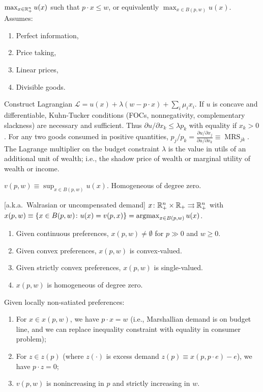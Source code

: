 \documentclass[8pt,letterpaper, landscape]{extarticle} %
\begin{document}
\begin{multicols}{3}
\begin{description}
 $ \max_{x \in \mathbb{R}^{n}_{+}} u(x) $ such that $ p \cdot x \leq w $, or equivalently $ \max_{x \in B(p,w)} u(x) $. Assumes:
\begin{enumerate}
\item Perfect information,
\item Price taking,
\item Linear prices,
\item Divisible goods.
\end{enumerate}
Construct Lagrangian $ \mathcal{L} = u(x) + \lambda (w - p \cdot x) + \sum_{i} \mu_i x_i $. If $ u $ is concave and differentiable, Kuhn-Tucker conditions (FOCs, nonnegativity, complementary slackness) are necessary and sufficient. Thus $ \partial u / \partial x_k \leq \lambda p_k $ with equality if $ x_k > 0 $. For any two goods consumed in positive quantities, $ p_j / p_k = \frac{\partial u / \partial x_j}{\partial u / \partial x_k} \equiv \operatorname{MRS}_{jk} $. The Lagrange multiplier on the budget constraint $ \lambda $ is the value in utils of an additional unit of wealth; i.e., the shadow price of wealth or marginal utility of wealth or income.

 $ v(p, w) \equiv \sup_{x \in B(p,w)} u(x) $. Homogeneous of degree zero. 

 [a.k.a.\ Walrasian or uncompensated demand] $ x \colon \mathbb{R}^{n}_{+} \times \mathbb{R}_{+} \rightrightarrows \mathbb{R}^{n}_{+} $ with $ x(p,w) \equiv \{ x \in B(p,w) \colon u(x) = v(p,x) \} = \operatorname*{argmax}_{x \in B(p,w)} u(x) $.
\begin{enumerate}
\item Given continuous preferences, $ x(p, w) \neq \emptyset $ for $ p \gg 0 $ and $ w \geq 0 $.
\item Given convex preferences, $ x(p,w) $ is convex-valued.
\item Given strictly convex preferences, $ x(p,w) $ is single-valued.
\item $ x(p,w) $ is homogeneous of degree zero.
\end{enumerate}

 Given locally non-satiated preferences:
\begin{enumerate}
\item For $ x \in x(p,w) $, we have $ p \cdot x = w $ (i.e., Marshallian demand is on budget line, and we can replace inequality constraint with equality in consumer problem);
\item For $ z \in z(p) $ (where $ z (\cdot) $ is excess demand $ z(p) \equiv x(p, p \cdot e) - e  $), we have $ p \cdot z = 0 $;
\item $ v(p,w) $ is nonincreasing in $ p $ and strictly increasing in $ w $.
\end{enumerate}


\end{description}
\end{multicols}
\end{document}

